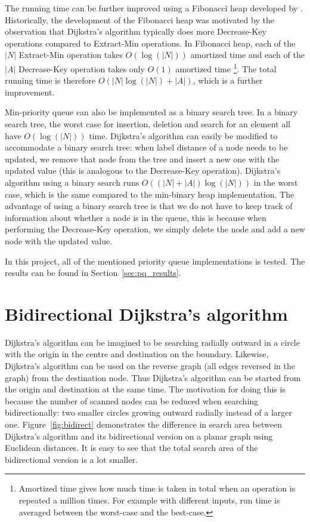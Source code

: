 The running time can be further improved using a Fibonacci heap developed by \citet{Fredman}.
Historically, the development of the Fibonacci heap was motivated by the observation that Dijkstra's algorithm typically does more Decrease-Key operations compared to Extract-Min operations.
In Fibonacci heap, each of the $|N|$ Extract-Min operation takes $O(\log(|N|))$ amortized time
and each of the $|A|$ Decrease-Key operation takes only $O(1)$ amortized time
\footnote{Amortized time gives how much time is taken in total when an operation is repeated a million times. For example with different inputs, run time is averaged between the worst-case and the best-case.}.
The total running time is therefore $O(|N| \log(|N|)+|A|)$,
which is a further improvement.

Min-priority queue can also be implemented as a binary search tree.
In a binary search tree, the worst case for insertion, deletion and search for an element all have $O(\log(|N|))$ time.
Dijkstra's algorithm can easily be modified to accommodate a binary search tree:
when label distance of a node needs to be updated,
we remove that node from the tree and insert a new one with the updated value (this is analogous to the Decrease-Key operation).
Dijkstra's algorithm using a binary search runs $O((|N|+|A|)\log(|N|))$ in the worst case, which is the same compared to the min-binary heap implementation.
The advantage of using a binary search tree is that we do not have to keep track of information about whether a node is in the queue,
this is because when performing the Decrease-Key operation,
we simply delete the node and add a new node with the updated value.

In this project, all of the mentioned priority queue implementations is tested.
The results can be found in Section~\ref{sec:pq_results}.

\section{Bidirectional Dijkstra's algorithm} \label{section:bidirectional}
Dijkstra's algorithm can be imagined to be searching radially outward in a circle with the origin in the centre and destination on the boundary.
Likewise, Dijkstra's algorithm can be used on the reverse graph (all edges reversed in the graph) from the destination node.
Thus Dijkstra's algorithm can be started from the origin and destination at the same time.
The motivation for doing this is because the number of scanned nodes can be reduced when searching bidirectionally:
two smaller circles growing outward radially instead of a larger one.
Figure~\ref{fig:bidirect} demonstrates the difference in search area between Dijkstra's algorithm and its bidirectional version on a planar graph using Euclidean distances.
It is easy to see that the total search area of the bidirectional version is a lot smaller.

